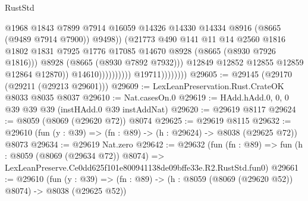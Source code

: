 \begin{lexlean}{RustStd}
\begin{coremodule}
                                                  @1968
                                                  @1843
                                                  @7899
                                                  @7914
                                                  @16059
                                                  @14326
                                                  @14330
                                                  @14334
                                                  @8916
                                                  (@8665 (@9489 @7914 @7900))
                                                  @9498))
                                              (@21773
                                                @490
                                                @141
                                                @11
                                                @14
                                                @2560
                                                @1816
                                                @1802
                                                @1831
                                                @7925
                                                @1776
                                                @17085
                                                @14670
                                                @8928
                                                (@8665 (@8930 @7926 @1816)))
                                              @8928
                                              (@8665 (@8930 @7892 @7932)))
                                            @12849
                                            @12852
                                            @12855
                                            @12859
                                            @12864
                                            @12870))
                                        @14610))))))))))
                    @19711))))))))
@29605 := @29145 (@29170 (@29211 (@29213 @29601)))
@29609 := LexLeanPreservation.Rust.CrateOK @8033 @8035 @8037
@29610 := Nat.casesOn.{0}
@29619 := HAdd.hAdd.{0, 0, 0} @39 @39 @39 (instHAdd.{0} @39 instAddNat)
@29620 := @29619 @8117
@29624 := @8059 (@8069 (@29620 @72)) @8074
@29625 := @29619 @8115
@29632 := @29610 (fun (y : @39) => (fn : @89) -> (h : @29624) -> @8038 (@29625 @72)) @8073
@29634 := @29619 Nat.zero
@29642 := @29632
    (fun (fn : @89) =>
    fun (h : @8059 (@8069 (@29634 @72)) @8074) =>
    LexLeanPreserve.Ce0dd625f101e800941138de09bffe33e.R2.RustStd.fun0)
@29661 := @29610
    (fun (y : @39) => (fn : @89) -> (h : @8059 (@8069 (@29620 @52)) @8074) -> @8038 (@29625 @52))

\end{coremodule}
\end{lexlean}
